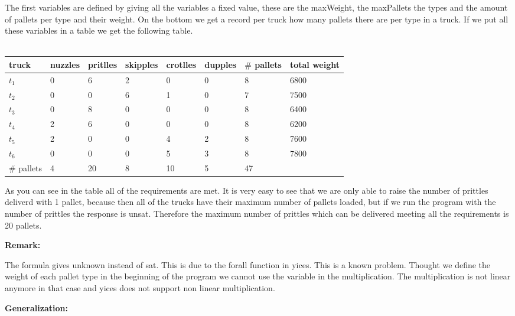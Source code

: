 \documentclass[12pt]{article}
\begin{document}
\noindent The first variables are defined by giving all the variables a fixed value, these are the maxWeight, the maxPallets the types and the amount of pallets per type and their weight. On the bottom we get a record per truck how many pallets there are per type in a truck. If we put all these variables in a table we get the following table.\\
\\
\begin{tabular}{| l | l | l | l | l | l | l | l |}
\hline
truck	& nuzzles	& pritlles	& skipples	& crotlles	& dupples & $\#$ pallets & total weight\\
\hline
$t_1$	& 0	&	6	&	2	&	0	&	0	& 8 & 6800\\
$t_2$	& 0	&	0	&	6	&	1	&	0	& 7 & 7500\\
$t_3$	& 0	&	8	&	0	&	0	&	0	& 8 & 6400\\
$t_4$	& 2	&	6	&	0	&	0	&	0	& 8 & 6200\\
$t_5$	& 2	&	0	&	0	&	4	&	2	& 8 & 7600\\
$t_6$	& 0	&	0	&	0	&	5	&	3	& 8 & 7800\\
\hline
$\#$ pallets	&	4	&	20	&	8	&	10	&	5	&  47	&\\
\hline
\end{tabular}

\vspace{3mm}

\noindent As you can see in the table all of the requirements are met. It is very easy to see that we are only able to raise the number of prittles deliverd with 1 pallet, because then all of the trucks have their maximum number of pallets loaded, but if we run the program with the number of prittles the response is unsat. Therefore the maximum number of prittles which can be delivered meeting all the requirements is 20 pallets.

\vspace{3mm}

{\bf Remark:} 

\noindent The formula gives unknown instead of sat. This is due to the forall function in yices. This is a known problem.
Thought we define the weight of each pallet type in the beginning of the program we cannot use the variable in the multiplication.
The multiplication is not linear anymore in that case and yices does not support non linear multiplication.

\vspace{3mm}

{\bf Generalization:} 
\end{document}
